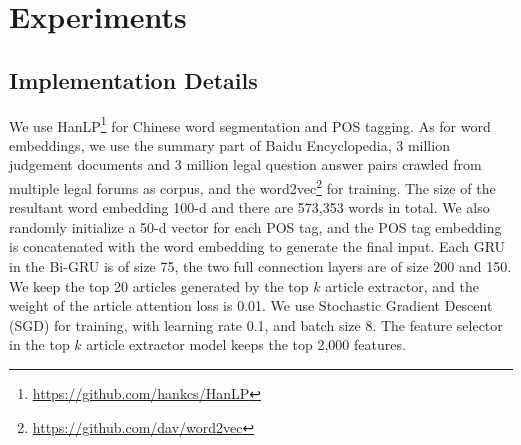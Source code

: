\section{Experiments}
\subsection{Implementation Details}
We use HanLP\footnote{\url{https://github.com/hankcs/HanLP}} for Chinese word segmentation and POS tagging. 
As for word embeddings, we use the summary part of Baidu Encyclopedia, 3 million judgement documents and 3 million legal question answer pairs crawled from multiple legal forums as corpus, and the word2vec\footnote{\url{https://github.com/dav/word2vec}} for training. 
The size of the resultant word embedding 100-d and there are 573,353 words in total. 
We also randomly initialize a 50-d vector for each POS tag, and the POS tag embedding is concatenated with the word embedding to generate the final input. 
Each GRU in the Bi-GRU is of size 75, the two full connection layers are of size 200 and 150.
We keep the top 20 articles generated by the top $k$ article extractor, and the weight of the article attention loss is 0.01. 
We use Stochastic Gradient Descent (SGD) for training, with learning rate 0.1, and batch size 8.
The feature selector in the top $k$ article extractor model keeps the top 2,000 features.


